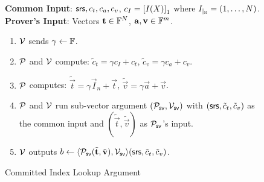 \begin{figure}[htbp]
\begin{mdframed}
{
    {\bf Common Input}: $\mathsf{srs},c_t, c_a, c_v$, $c_I=\left[{I(X)}\right]_1$ where ${I}_{|_{\mathbb{H}}}=(1,\ldots,N)$.\\
    {\bf Prover's Input}: Vectors $\mathbf{t}\in \mathbb{F}^N$, $\mathbf{a},\mathbf{v}\in\mathbb{F}^m$.
    \begin{enumerate}[leftmargin=1em, label=\arabic*.]
    \item $\mathcal{V}$ sends $\gamma\gets \mathbb{F}$.
    \item $\mathcal{P}$ and $\mathcal{V}$ compute: $\tilde{c}_t=\gamma c_I+c_t$, $\tilde{c}_v=\gamma c_a + c_v$.
    \item $\mathcal{P}$ computes: $\tilde{\vec{t}}=\gamma\vec{I}_n + \vec{t}$, $\tilde{\vec{v}}=\gamma\vec{a} + \vec{v}$.
    \item $\mathcal{P}$ and $\mathcal{V}$ run sub-vector argument $(\mathcal{P}_{\mathsf{sv}},\mathcal{V}_{\mathsf{sv}})$ with
    $(\mathsf{srs},\tilde{c}_t,\tilde{c}_v)$ as the common input and $(\tilde{\vec{t}},\tilde{\vec{v}})$ as $\mathcal{P}_{\mathsf{sv}}$'s input.
    \item $\mathcal{V}$ outputs
    $b\gets \langle {\ensuremath{\mathcal{P}}_{\mathsf{sv}}}({\tilde{\mathbf{t}},\tilde{\mathbf{v}}}), {\mathcal{V}_{\mathsf{sv}}}\rangle({\mathsf{srs},\tilde{c}_t,\tilde{c}_v})$.
    \end{enumerate}
}
\end{mdframed}
\caption{Committed Index Lookup Argument}
\label{fig:committed-index-lookup}
\end{figure}

